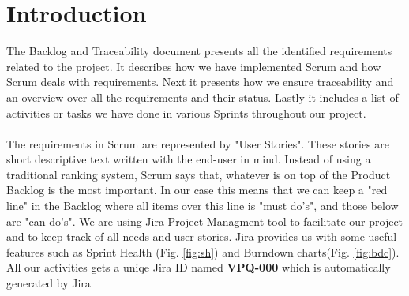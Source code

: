 \section{Introduction}
The Backlog and Traceability document presents all the identified requirements related to the project. It describes how we have implemented Scrum and how Scrum deals with requirements. Next it presents how we ensure traceability and an overview over all the requirements and their status. Lastly it includes a list of activities or tasks we have done in various Sprints throughout our project. \\
\\
The requirements in Scrum are represented by "User Stories". These stories are short descriptive text written with the end-user in mind. Instead of using a traditional ranking system, Scrum says that, whatever is on top of the Product Backlog is the most important. In our case this means that we can keep a "red line" in the Backlog where all items over this line is "must do's", and those below are "can do's". 
We are using Jira Project Managment tool to facilitate our project and to keep track of all needs and user stories. Jira provides us with some useful features such as Sprint Health (Fig. \ref{fig:sh}) and Burndown charts(Fig. \ref{fig:bdc}). All our activities gets a uniqe Jira ID named \textbf{VPQ-000} which is automatically generated by Jira \\
\\ 

